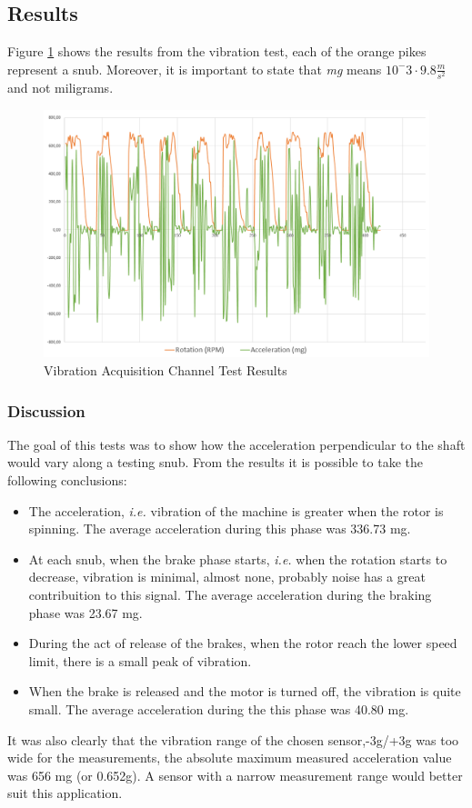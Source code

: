 	\subsection{Results}	

		Figure \ref{fig:test-vibration} shows the results from the vibration test, each of the orange pikes represent a snub. Moreover, it is important to state that \textit{mg} means $10^-3 \cdot 9.8 \frac{m}{s^2}$ and not miligrams.

		\begin{figure}[htbp]
			\centering
			\includegraphics[width=.9\textwidth]{figuras/fig-test-vibration}
			\caption{Vibration Acquisition Channel Test Results}
			\label{fig:test-vibration}
		\end{figure}

	\subsubsection{Discussion}

		The goal of this tests was to show how the acceleration perpendicular to the shaft would vary along a testing snub. From the results it is possible to take the following conclusions:

		\begin{itemize}
			\item The acceleration, \textit{i.e.} vibration of the machine is greater when the rotor is spinning. The average acceleration during this phase was 336.73 mg.
			\item At each snub, when the brake phase starts, \textit{i.e.} when the rotation starts to decrease, vibration is minimal, almost none, probably noise has a great contribuition to this signal. The average acceleration during the braking phase was 23.67 mg.
			\item During the act of release of the brakes, when the rotor reach the lower speed limit, there is a small peak of vibration.
			\item When the brake is released and the motor is turned off, the vibration is quite small. The average acceleration during the this phase was 40.80 mg.
		\end{itemize}

		It was also clearly that the vibration range of the chosen sensor,-3g/+3g \cite{devices2010adxl335} was too wide for the measurements, the absolute maximum measured acceleration value was 656 mg (or 0.652g). A sensor with a narrow measurement range would better suit this application.